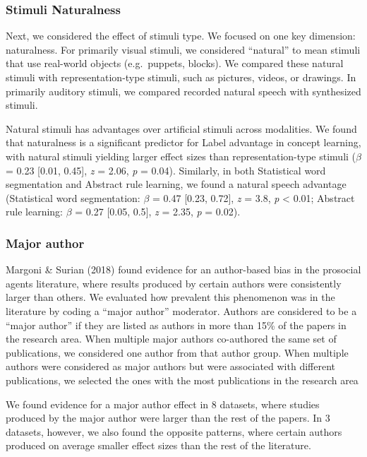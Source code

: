 \documentclass[10pt, letterpaper]{article}
\begin{document}
\hypertarget{stimuli-naturalness}{%
\subsubsection{Stimuli Naturalness}\label{stimuli-naturalness}}

Next, we considered the effect of stimuli type. We focused on one key
dimension: naturalness. For primarily visual stimuli, we considered
``natural'' to mean stimuli that use real-world objects (e.g.~puppets,
blocks). We compared these natural stimuli with representation-type
stimuli, such as pictures, videos, or drawings. In primarily auditory
stimuli, we compared recorded natural speech with synthesized stimuli.

Natural stimuli has advantages over artificial stimuli across
modalities. We found that naturalness is a significant predictor for
Label advantage in concept learning, with natural stimuli yielding
larger effect sizes than representation-type stimuli (\(\beta\) = 0.23
{[}0.01, 0.45{]}, \emph{z} = 2.06, \emph{p} = 0.04). Similarly, in both
Statistical word segmentation and Abstract rule learning, we found a
natural speech advantage (Statistical word segmentation: \(\beta\) =
0.47 {[}0.23, 0.72{]}, \emph{z} = 3.8, \emph{p} \textless{} 0.01;
Abstract rule learning: \(\beta\) = 0.27 {[}0.05, 0.5{]}, \emph{z} =
2.35, \emph{p} = 0.02).

\hypertarget{major-author}{%
\subsubsection{Major author}\label{major-author}}

Margoni \& Surian (2018) found evidence for an author-based bias in the
prosocial agents literature, where results produced by certain authors
were consistently larger than others. We evaluated how prevalent this
phenomenon was in the literature by coding a ``major author'' moderator.
Authors are considered to be a ``major author'' if they are listed as
authors in more than 15\% of the papers in the research area. When
multiple major authors co-authored the same set of publications, we
considered one author from that author group. When multiple authors were
considered as major authors but were associated with different
publications, we selected the ones with the most publications in the
research area

We found evidence for a major author effect in 8 datasets, where studies
produced by the major author were larger than the rest of the papers. In
3 datasets, however, we also found the opposite patterns, where certain
authors produced on average smaller effect sizes than the rest of the
literature.
\end{document}
